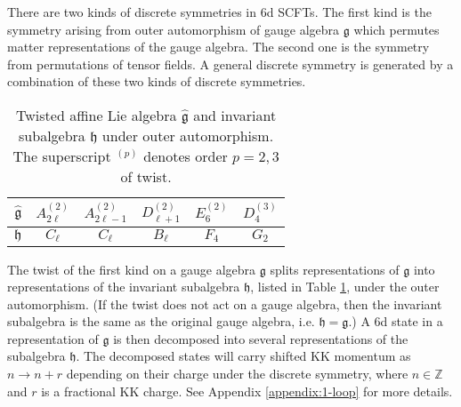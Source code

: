 There are two kinds of discrete symmetries in 6d SCFTs. The first kind is the symmetry arising from outer automorphism of gauge algebra $\mathfrak{g}$ which permutes matter representations of the gauge algebra. The second one is the symmetry from permutations of tensor fields. A general discrete symmetry is generated by a combination of these two kinds of discrete symmetries.

\begin{table}[t]
\centering
\begin{tabular}{|c|c|c|c|c|c|}
	\hline
	$\mathfrak{\hat{g}}$ & $A_{2\ell}^{(2)}$ & $A_{2\ell-1}^{(2)}$ & $D^{(2)}_{\ell+1}$ & $E_6^{(2)}$ & $D_4^{(3)}$  \\
	\hline 
	$\mathfrak{h}$ & $C_\ell$ & $C_\ell$ & $B_\ell$ & $F_4$ & $G_2$  \\ 
	\hline
\end{tabular}
\caption{Twisted affine Lie algebra $\mathfrak{\hat{g}}$ and invariant subalgebra $\mathfrak{h}$ under outer automorphism. The superscript ${}^{(p)}$ denotes order $p=2,3$ of twist.}\label{tb:g-h}
\end{table}

The twist of the first kind on a gauge algebra $\mathfrak{g}$ splits representations of  $\mathfrak{g}$ into representations of the invariant subalgebra $\mathfrak{h}$, listed in Table \ref{tb:g-h}, under the outer automorphism. (If the twist does not act on a gauge algebra, then the invariant subalgebra is the same as the original gauge algebra, i.e. $\mathfrak{h}=\mathfrak{g}$.) A 6d state in a representation of $\mathfrak{g}$ is then decomposed into several representations of the subalgebra $\mathfrak{h}$. The decomposed states will carry shifted KK momentum as $n\rightarrow n+r$ depending on their charge under the discrete symmetry, where $n\in \mathbb{Z}$ and $r$ is a fractional KK charge. See Appendix \ref{appendix:1-loop} for more details.

